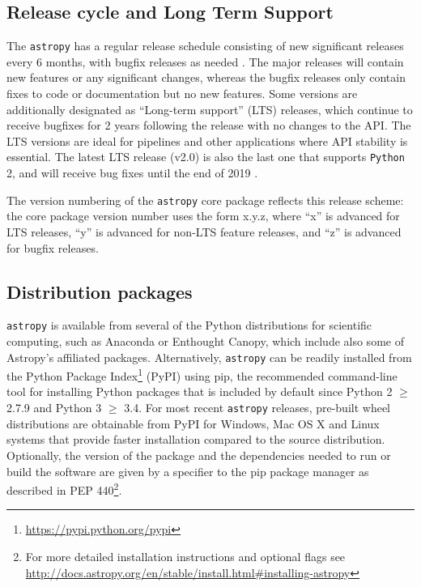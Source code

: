 \documentclass[modern]{aastex61}
\newcommand{\package}[1]{\texttt{#1}\xspace}
\newcommand{\python}{\package{Python}}
\newcommand{\astropy}{Astropy\xspace}
\newcommand{\astropypkg}{\package{astropy}}
\begin{document}

\subsection{Release cycle and Long Term Support}

The \astropypkg has a regular release schedule consisting of new significant
releases every 6 months, with bugfix releases as needed \citep{ape2}.
The major releases will contain new features or any significant changes, whereas
the bugfix releases only contain fixes to code or documentation but no new
features.
Some versions are additionally designated as ``Long-term support'' (LTS)
releases, which continue to receive bugfixes for 2 years following the release
with no changes to the API.
The LTS versions are ideal for pipelines and other applications where API
stability is essential.
The latest LTS release (v2.0) is also the last one that supports \python 2, and
will receive bug fixes until the end of 2019 \citep{ape10}.

The version numbering of the \astropypkg core package reflects this release
scheme: the core package version number uses the form x.y.z, where ``x'' is
advanced for LTS releases, ``y'' is advanced for non-LTS feature releases, and
``z'' is advanced for bugfix releases.

\subsection{Distribution packages}

\astropypkg is available from several of the Python distributions for scientific
%
%
computing, such as Anaconda or Enthought Canopy, which include also some of
\astropy's affiliated packages.
Alternatively, \astropypkg can be readily installed from the Python Package
Index\footnote{\url{https://pypi.python.org/pypi}} (PyPI) using pip, the
recommended command-line tool for installing Python packages
that is included by default since Python 2 $\geq$ 2.7.9 and Python 3 $\geq$ 3.4.
For most recent \astropypkg releases, pre-built wheel distributions are obtainable
from PyPI for Windows, Mac OS X and Linux systems that provide faster
installation compared to the source distribution.  Optionally, the version of
the package and the dependencies needed to run or build the software are given
by a specifier to the pip package manager as described in PEP 440\footnote{For
more detailed installation instructions and optional flags see
\url{http://docs.astropy.org/en/stable/install.html\#installing-astropy}}.
\end{document}
